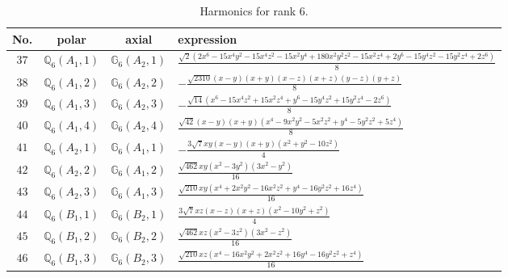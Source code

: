 \documentclass[fleqn,8pt,landscape]{jsarticle}
\begin{document}
\begin{table}[ht!]
\begin{center}
\caption{Harmonics for rank 6.}
\renewcommand{\arraystretch}{1.3}
\begin{tabular}{cccl} \hline \hline
No. & polar & axial & expression \\ \hline
$ 37 $ & $ \mathbb{Q}_{6}(A_{1},1) $ & $ \mathbb{G}_{6}(A_{2},1) $ & $ \frac{\sqrt{2} \left(2 x^{6} - 15 x^{4} y^{2} - 15 x^{4} z^{2} - 15 x^{2} y^{4} + 180 x^{2} y^{2} z^{2} - 15 x^{2} z^{4} + 2 y^{6} - 15 y^{4} z^{2} - 15 y^{2} z^{4} + 2 z^{6}\right)}{8} $ \\
$ 38 $ & $ \mathbb{Q}_{6}(A_{1},2) $ & $ \mathbb{G}_{6}(A_{2},2) $ & $ - \frac{\sqrt{2310} \left(x - y\right) \left(x + y\right) \left(x - z\right) \left(x + z\right) \left(y - z\right) \left(y + z\right)}{8} $ \\
$ 39 $ & $ \mathbb{Q}_{6}(A_{1},3) $ & $ \mathbb{G}_{6}(A_{2},3) $ & $ - \frac{\sqrt{14} \left(x^{6} - 15 x^{4} z^{2} + 15 x^{2} z^{4} + y^{6} - 15 y^{4} z^{2} + 15 y^{2} z^{4} - 2 z^{6}\right)}{8} $ \\
$ 40 $ & $ \mathbb{Q}_{6}(A_{1},4) $ & $ \mathbb{G}_{6}(A_{2},4) $ & $ \frac{\sqrt{42} \left(x - y\right) \left(x + y\right) \left(x^{4} - 9 x^{2} y^{2} - 5 x^{2} z^{2} + y^{4} - 5 y^{2} z^{2} + 5 z^{4}\right)}{8} $ \\
$ 41 $ & $ \mathbb{Q}_{6}(A_{2},1) $ & $ \mathbb{G}_{6}(A_{1},1) $ & $ - \frac{3 \sqrt{7} x y \left(x - y\right) \left(x + y\right) \left(x^{2} + y^{2} - 10 z^{2}\right)}{4} $ \\
$ 42 $ & $ \mathbb{Q}_{6}(A_{2},2) $ & $ \mathbb{G}_{6}(A_{1},2) $ & $ \frac{\sqrt{462} x y \left(x^{2} - 3 y^{2}\right) \left(3 x^{2} - y^{2}\right)}{16} $ \\
$ 43 $ & $ \mathbb{Q}_{6}(A_{2},3) $ & $ \mathbb{G}_{6}(A_{1},3) $ & $ \frac{\sqrt{210} x y \left(x^{4} + 2 x^{2} y^{2} - 16 x^{2} z^{2} + y^{4} - 16 y^{2} z^{2} + 16 z^{4}\right)}{16} $ \\
$ 44 $ & $ \mathbb{Q}_{6}(B_{1},1) $ & $ \mathbb{G}_{6}(B_{2},1) $ & $ \frac{3 \sqrt{7} x z \left(x - z\right) \left(x + z\right) \left(x^{2} - 10 y^{2} + z^{2}\right)}{4} $ \\
$ 45 $ & $ \mathbb{Q}_{6}(B_{1},2) $ & $ \mathbb{G}_{6}(B_{2},2) $ & $ \frac{\sqrt{462} x z \left(x^{2} - 3 z^{2}\right) \left(3 x^{2} - z^{2}\right)}{16} $ \\
$ 46 $ & $ \mathbb{Q}_{6}(B_{1},3) $ & $ \mathbb{G}_{6}(B_{2},3) $ & $ \frac{\sqrt{210} x z \left(x^{4} - 16 x^{2} y^{2} + 2 x^{2} z^{2} + 16 y^{4} - 16 y^{2} z^{2} + z^{4}\right)}{16} $ \\

\end{tabular}
\end{center}
\end{table}
\end{document}
